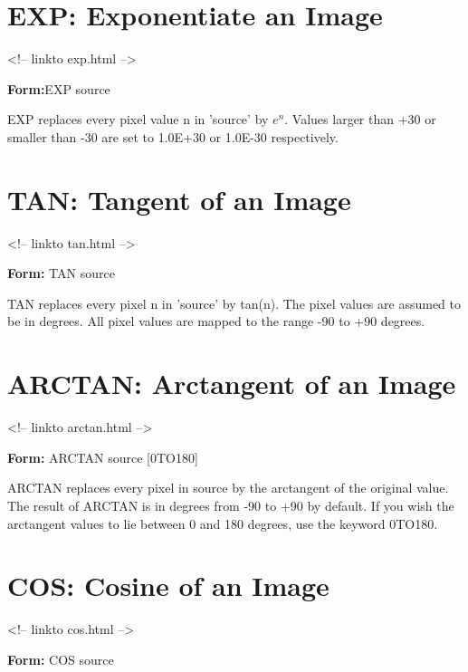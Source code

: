\section{EXP: Exponentiate an Image}
\begin{rawhtml}
<!-- linkto exp.html -->
\end{rawhtml}
\begin{command}
  \item[\textbf{Form:}EXP source\hfill]{}
\end{command}

EXP replaces every pixel value n in 'source' by $e^n$.  Values larger than
+30 or smaller than -30 are set to 1.0E+30 or 1.0E-30 respectively.

\section{TAN: Tangent of an Image}
\begin{rawhtml}
<!-- linkto tan.html -->
\end{rawhtml}
\begin{command}
  \item[\textbf{Form:}  TAN source\hfill]{}
\end{command}

TAN replaces every pixel n in 'source' by tan(n).  The pixel values are
assumed to be in degrees.  All pixel values are mapped to the range -90 to
+90 degrees.

\section{ARCTAN: Arctangent of an Image}
\begin{rawhtml}
<!-- linkto arctan.html -->
\end{rawhtml}
\begin{command}
  \item[\textbf{Form:} ARCTAN source {[0TO180]}\hfill]{}
\end{command}

ARCTAN replaces every pixel in source by the arctangent of the original
value.  The result of ARCTAN is in degrees from -90 to +90 by default.  If
you wish the arctangent values to lie between 0 and 180 degrees, use the
keyword 0TO180.

\section{COS: Cosine of an Image}
\begin{rawhtml}
<!-- linkto cos.html -->
\end{rawhtml}
\begin{command}
  \item[\textbf{Form:} COS source\hfill]{}
\end{command}

